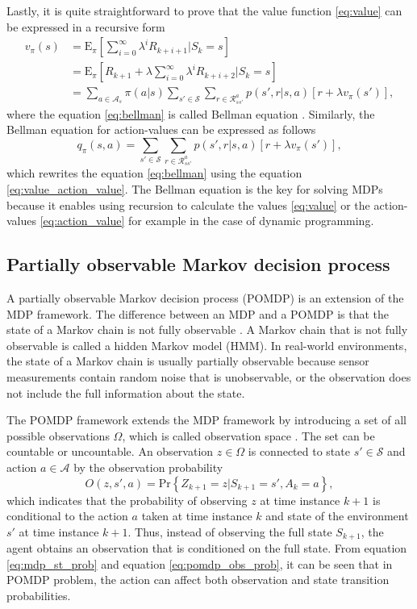 \documentclass[english, 12pt, a4paper, elec, utf8, a-1b, online]{aaltothesis}
\numberwithin{equation}{section}
\newcommand{\Epolicy}[1]{\mathrm{E}_\pi \left[ #1 \right]}
\newcommand{\Ss}{\mathcal{S}}
\newcommand{\As}{\mathcal{A}}
\newcommand{\Rs}{\mathcal{R}}
\newcommand{\Os}{\Omega}
\newcommand{\Op}{O}
\renewcommand{\Pr}[1]{\text{Pr}\left\{ #1 \right\}}
\begin{document}
Lastly, it is quite straightforward to prove that the value function \eqref{eq:value} can be expressed in a recursive form 
\begin{align}
    v_\pi(s) 
    &= \Epolicy{ \sum_{i=0}^{\infty} \lambda^i R_{k + i + 1} | S_k=s} \\
    &= \Epolicy{R_{k + 1} + \lambda \sum_{i=0}^{\infty} \lambda^i R_{k + i + 2} | S_k=s} \\
    &= \sum_{a \in \As_s} \pi(a | s) \sum_{s' \in \Ss} \sum_{r \in \Rs_{ss'}^a} p(s', r | s, a) \left[ r + \lambda v_\pi(s') \right]\label{eq:bellman},
\end{align}
where the equation \eqref{eq:bellman} is called Bellman equation \cite{Sutton2018}.
Similarly, the Bellman equation for action-values can be expressed as follows
\begin{equation}\label{eq:bellman_action}
     q_\pi(s, a) = \sum_{s' \in \Ss} \sum_{r \in \Rs_{ss'}^a} p(s', r | s, a) \left[ r + \lambda v_\pi(s') \right],
\end{equation}
which rewrites the equation \eqref{eq:bellman} using the equation \eqref{eq:value_action_value}.
The Bellman equation is the key for solving MDPs because it enables using recursion to calculate the values \eqref{eq:value} or the action-values \eqref{eq:action_value} for example in the case of dynamic programming.


\subsection{Partially observable Markov decision process} \label{sec:POMDP}


A partially observable Markov decision process (POMDP) is an extension of the MDP framework. 
The difference between an MDP and a POMDP is that the state of a Markov chain is not fully observable \cite{Krishnamurthy2016}.
A Markov chain that is not fully observable is called a hidden Markov model (HMM).
In real-world environments, the state of a Markov chain is usually partially observable because sensor measurements contain random noise that is unobservable, or the observation does not include the full information about the state.

The POMDP framework extends the MDP framework by introducing a set of all possible observations $\Os$, which is called observation space \cite{Krishnamurthy2016}.
The set can be countable or uncountable.
An observation $z \in \Os$ is connected to state $s' \in \Ss$ and action $a \in \As$ by the observation probability
\begin{equation}\label{eq:pomdp_obs_prob}
    \Op(z , s', a) = \Pr{Z_{k+1}=z | S_{k+1}=s', A_k=a},
\end{equation}
which indicates that the probability of observing $z$ at time instance $k+1$ is conditional to the action $a$ taken at time instance $k$ and state of the environment $s'$ at time instance $k+1$.
Thus, instead of observing the full state $S_{k+1}$, the agent obtains an observation that is conditioned on the full state.
From equation \eqref{eq:mdp_st_prob} and equation \eqref{eq:pomdp_obs_prob}, it can be seen that in POMDP problem, the action can affect both observation and state transition probabilities.
\end{document}
